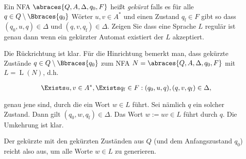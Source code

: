 
\begin{exercise}

Ein NFA $\abraces{Q, A, \Delta, q_0, F}$ heißt \textit{gekürzt} falls es für alle $q \in Q \setminus \Bbraces{q_0}$ Wörter $u, v \in A^\ast$ und einen Zustand $q_\mathrm{f} \in F$ gibt so dass $(q_0, u, q) \in \Delta$ und $(q, v, q_\mathrm{f}) \in \Delta$.
Zeigen Sie dass eine Sprache $L$ regulär ist genau dann wenn ein gekürzter Automat existiert der $L$ akzeptiert.

\end{exercise}


\begin{solution}

Die Rückrichtung ist klar.
Für die Hinrichtung bemerkt man, dass gekürzte Zustände $q \in Q \setminus \Bbraces{q_0}$ zum NFA $N = \abraces{Q, A, \Delta, q_0, F}$ mit $L = \operatorname L(N)$, d.h.

\begin{align*}
    \Exists u, v \in A^\ast, \Exists q_\mathrm{f} \in F:
        (q_0, u, q), (q, v, q_\mathrm{f}) \in \Delta,
\end{align*}

genau jene sind, durch die ein Wort $w \in L$ führt.
Sei nämlich $q$ ein solcher Zustand.
Dann gilt $(q_0, w, q_\mathrm{f}) \in \Delta$.
Das Wort $w := uv \in L$ führt durch $q$.
Die Umkehrung ist klar.

Der gekürzte  mit den gekürzten Zuständen aus $Q$ (und dem Anfangszustand $q_0$) reicht also aus, um alle Worte $w \in L$ zu generieren.

\end{solution}

